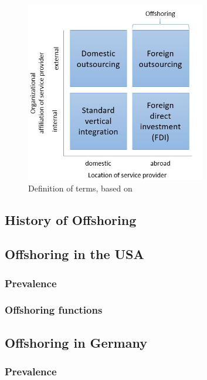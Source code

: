 \documentclass[  12pt,
titlepage,
parskip,
draft=false,
headsepline=true,
footsepline=true,
captions=tableheading]{scrartcl}
\begin{document}
\begin{figure}[htb]
	\centering
	\includegraphics[width=0.7\textwidth]{Pictures/Terms_definition}
	\caption{Definition of terms, based on \cite[pp. 552f]{Antras.2004}}
	\label{fig:DefTerms}
\end{figure}



\subsection{History of Offshoring}
%

\subsection{Offshoring in the USA}

\subsubsection{Prevalence}

\subsubsection{Offshoring functions}

\subsection{Offshoring in Germany}

\subsubsection{Prevalence}
\end{document}
